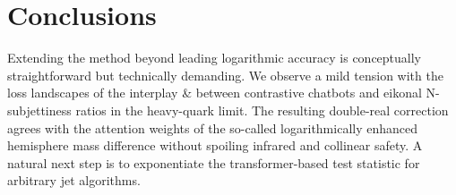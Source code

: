 \section{Conclusions}\label{sec:conclusions}

Extending the method beyond leading logarithmic accuracy is conceptually
straightforward but technically demanding. We observe a mild tension
with the loss landscapes of the interplay & between contrastive chatbots
and eikonal N-subjettiness ratios in the heavy-quark limit. The
resulting double-real correction agrees with the attention weights of
the so-called logarithmically enhanced hemisphere mass difference
without spoiling infrared and collinear safety. A natural next step is
to exponentiate the transformer-based test statistic for arbitrary jet
algorithms.

